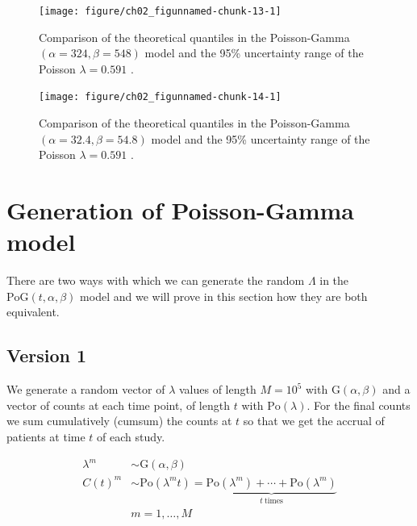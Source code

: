 \begin{figure}
\begin{knitrout}
\color{fgcolor}

{\centering \texttt{[image: figure/ch02\_figunnamed-chunk-13-1]} 

}


\end{knitrout}
  \caption{Comparison of the theoretical quantiles in the Poisson-Gamma $(\alpha = 324, \beta = 548)$ model and the 95\% uncertainty range of the Poisson $\lambda = 0.591$ \citep{spiegelhalter2011visualizing, pkgacc}.}
  \label{fig:2_11}
\end{figure}


\begin{figure}
\begin{knitrout}
\color{fgcolor}

{\centering \texttt{[image: figure/ch02\_figunnamed-chunk-14-1]} 

}


\end{knitrout}
  \caption{Comparison of the theoretical quantiles in the Poisson-Gamma $(\alpha = 32.4, \beta = 54.8)$ model and the 95\% uncertainty range of the Poisson $\lambda = 0.591$ \citep{spiegelhalter2011visualizing, pkgacc}.}
  \label{fig:2_11a}
\end{figure}

\section{Generation of Poisson-Gamma model}

There are two ways with which we can generate the random $\Lambda$ in the $\textrm{PoG}(t, \alpha, \beta)$ model and we will prove in this section how they are both equivalent.

\subsection{Version 1}

We generate a random vector of $\lambda$ values of length $M=10^5$ with $\textrm{G}(\alpha, \beta)$ and a vector of counts at each time point, of length $t$ with $\textrm{Po}(\lambda)$. For the final counts we sum cumulatively (cumsum) the counts at $t$ so that we get the accrual of patients at time $t$ of each study.

\begin{align*}
\lambda^m &\sim \textrm{G}(\alpha, \beta) \\
C(t)^m &\sim \textrm{Po} (\lambda^m t) = \underbrace{\textrm{Po} (\lambda^m) +\cdots +\textrm{Po} (\lambda^m)}_{t \ \text{times}}\\
& m = 1, \ldots, M
\end{align*}



